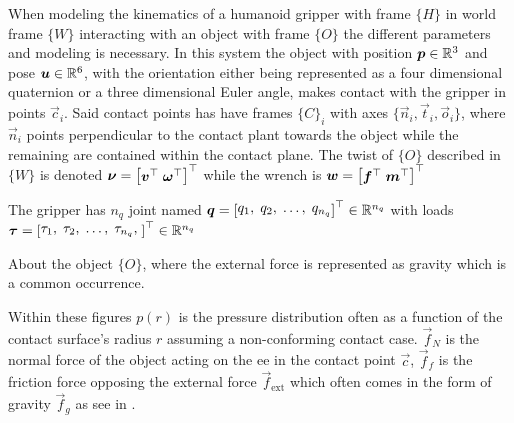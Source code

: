 \begin{center}
\begin{minipage}{.48\linewidth}
    \end{minipage}%
    \vspace{15pt}
    \begin{minipage}[t]{.48\linewidth}
        \vspace{0pt}
        \captionsetup{type=figure}
        \label{fig:friction-contact-distribution}
    \end{minipage}%
    \hfill%
    \begin{minipage}[t]{.48\linewidth}
        \vspace{0pt}
        \captionsetup{type=figure}
        \label{fig:force-closure-model}
    \end{minipage}%
\end{center}

When modeling the kinematics of a humanoid gripper with frame $\{H\}$ in world frame $\{W\}$ interacting with an object with frame $\{O\}$ the different parameters and modeling is necessary. In this system the object with position $\bm{p}\in\mathbb{R}^3$ and pose $\bm{u}\in\mathbb{R}^6$, with the orientation either being represented as a four dimensional quaternion or a three dimensional Euler angle, makes contact with the gripper in points $\vec{c}_i$. Said contact points has have frames $\{C\}_i$ with axes $\{\vec{n}_i,\vec{t}_i,\vec{o}_i\}$, where $\vec{n}_i$ points perpendicular to the contact plant towards the object while the remaining are contained within the contact plane. The twist of $\{O\}$ described in $\{W\}$ is denoted $\vec{\nu} = \rvec{\vec{v}^\T\; \vec{\omega}^\T}^\T $ while the wrench is $\vec{w} = \rvec{\vec{f}^\T\; \vec{m}^\T}^\T$

The gripper has $n_q$ joint named $\vec{q} = \rvec{q_1,\; q_2,\; \dots,\; q_{n_q}}^\T\in\R^{n_q}$ with loads $\vec{\tau} = \rvec{\tau_1,\;\tau_2,\;\dots,\;\tau_{n_q},\;}^\T\in\R^{n_q}$

About the object $\{O\}$, where the external force is represented as gravity which is a common occurrence.

Within these figures $p(r)$ is the pressure distribution often as a function of the contact surface's radius $r$ assuming a non-conforming contact case. $\vec{f}_N$ is the normal force of the object acting on the \gls{ee} in the contact point $\vec{c}$, $\vec{f}_f$ is the friction force opposing the external force $\vec{f}_{\text{ext}}$ which often comes in the form of gravity $\vec{f}_g$ as see in .

